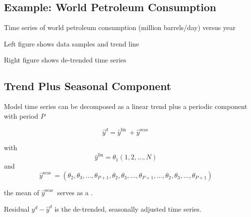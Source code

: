 \subsection{Example: World Petroleum Consumption}


Time series of world petroleum consumption (million barrels/day) versus year

Left figure shows data samples and trend line

Right figure shows de-trended time series


\subsection{Trend Plus Seasonal Component}

\begin{proposition}
    Model time series can be decomposed as a linear trend plus a periodic component with period $ P $

    \begin{equation}
    \hat{y}^{{d}}=\hat{y}^{\text {lin }}+\hat{y}^{\text {seas }}
    \end{equation}

    with \begin{equation} \hat{y}^{\operatorname{lin}}=\theta_{1}(1,2, \ldots, N) \end{equation} and
\begin{equation}
\hat{y}^{\text {seas }}=\left(\theta_{2}, \theta_{3}, \ldots, \theta_{P+1}, \theta_{2}, \theta_{3}, \ldots, \theta_{P+1}, \ldots, \theta_{2}, \theta_{3}, \ldots, \theta_{P+1}\right)
\end{equation}
\end{proposition}

\begin{definition}[Offset]
    the mean of $ \hat{y}^{\text {seas }} $ serves as a .
\end{definition}

\begin{definition}
    Residual $ y^{{d}}-\hat{y}^{{d}} $ is the de-trended, seasonally adjusted time series.
\end{definition}

